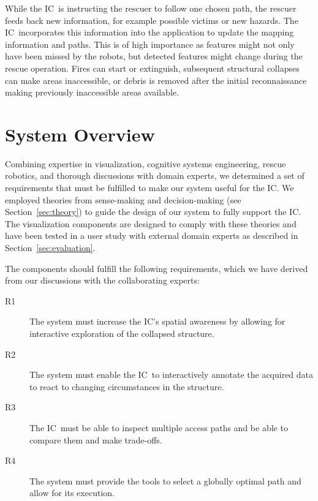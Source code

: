 \documentclass[conference,10pt,letter]{IEEEtran}
\def\IC{IC}
\begin{document}
While the \IC\ is instructing the rescuer to follow one chosen path, the rescuer feeds back new information, for example possible victims or new hazards. The \IC\ incorporates this information into the application to update the mapping information and paths. This is of high importance as features might not only have been missed by the robots, but detected features might change during the rescue operation. Fires can start or extinguish, subsequent structural collapses can make areas inaccessible, or debris is removed after the initial reconnaissance making previously inaccessible areas available. %


\section{System Overview} \label{sec:overview}

Combining expertise in visualization, cognitive systems engineering, rescue robotics, and thorough discussions with domain experts, we determined a set of requirements that must be fulfilled to make our system useful for the \IC. We employed theories from sense-making and decision-making (see Section~\ref{sec:theory}) to guide the design of our system to fully support the \IC. The visualization components are designed to comply with these theories and have been tested in a user study with external domain experts as described in Section~\ref{sec:evaluation}.

The components should fulfill the following requirements, which we have derived from our discussions with the collaborating experts:

\begin{description}
\item[R1] The system must increase the \IC 's spatial awareness by allowing for interactive exploration of the collapsed structure.
\item[R2] The system must enable the \IC\ to interactively annotate the acquired data to react to changing circumstances in the structure.
\item[R3] The \IC\ must be able to inspect multiple access paths and be able to compare them and make trade-offs.
\item[R4] The system must provide the tools to select a globally optimal path and allow for its execution.
\end{description}
\end{document}
